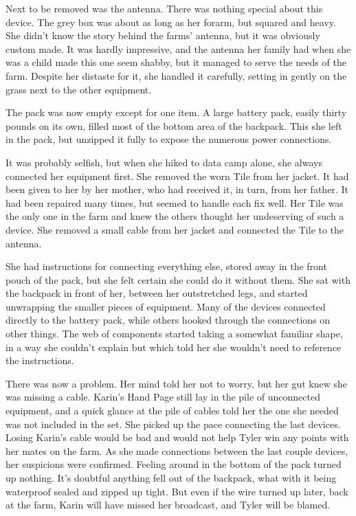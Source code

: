 Next to be removed was the antenna. There was nothing special about this device.
The grey box was about as long as her forarm, but squared and heavy. She didn't
know the story behind the farms' antenna, but it was obviously custom made.
It was hardly impressive, and the antenna her family had when she was a child
made this one seem shabby, but it managed to serve the needs of the farm.
Despite her distaste for it, she handled it carefully, setting in gently on the
grass next to the other equipment.

The pack was now empty except for one item. A large battery pack, easily thirty
pounds on its own, filled most of the bottom area of the backpack. This she left
in the pack, but unzipped it fully to expose the numerous power connections.

It was probably selfish, but when she hiked to data camp alone, she always 
connected her equipment first. She removed the worn Tile from her jacket.
It had been given to her by her mother, who had received it, in turn, from
her father. It had been repaired many times, but seemed to handle each
fix well. Her Tile was the only one in the farm and knew the others thought
her undeserving of such a device. She removed a small cable from her jacket
and connected the Tile to the antenna.

She had instructions for connecting everything else, stored away in the front pouch of the
pack, but she felt certain she could do it without them. She sat with the backpack
in front of her, between her outstretched legs, and started unwrapping the
smaller pieces of equipment. Many of the devices connected directly to the
battery pack, while others hooked through the connections on other things.
The web of components started taking a somewhat familiar shape, in a way she
couldn't explain but which told her she wouldn't need to reference the instructions.

There was now a problem. Her mind told her not to worry, but her gut knew
she was missing a cable. Karin's Hand Page still lay in the pile of unconnected
equipment, and a quick glance at the pile of cables told her the one she needed
was not included in the set. She picked up the pace connecting the last devices.
Losing Karin's cable would be bad and would not help Tyler win any points with
her mates on the farm. As she made connections between the last couple devices,
her suspicions were confirmed. Feeling around in the bottom of the pack turned
up nothing. It's doubtful anything fell out of the backpack, what with it being
waterproof sealed and zipped up tight. But even if the wire turned up later,
back at the farm, Karin will have missed her broadcast, and Tyler will be
blamed.

